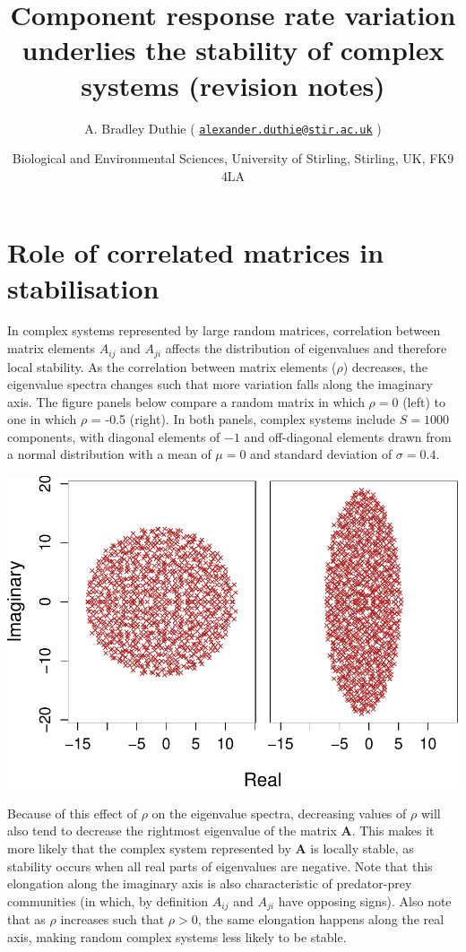 \documentclass[]{article}
\title{Component response rate variation underlies the stability of complex
systems (revision notes)}
\author{A. Bradley Duthie (
\href{mailto:alexander.duthie@stir.ac.uk}{\nolinkurl{alexander.duthie@stir.ac.uk}}
)}
\date{Biological and Environmental Sciences, University of Stirling, Stirling,
UK, FK9 4LA}
\begin{document}
\maketitle

\hypertarget{role-of-correlated-matrices-in-stabilisation}{%
\section{Role of correlated matrices in
stabilisation}\label{role-of-correlated-matrices-in-stabilisation}}

In complex systems represented by large random matrices, correlation
between matrix elements \(A_{ij}\) and \(A_{ji}\) affects the
distribution of eigenvalues and therefore local stability. As the
correlation between matrix elements (\(\rho\)) decreases, the eigenvalue
spectra changes such that more variation falls along the imaginary axis.
The figure panels below compare a random matrix in which \(\rho = 0\)
(left) to one in which \(\rho\) = -0.5 (right). In both panels, complex
systems include \(S = 1000\) components, with diagonal elements of
\(-1\) and off-diagonal elements drawn from a normal distribution with a
mean of \(\mu = 0\) and standard deviation of \(\sigma = 0.4\).

\includegraphics{revision_notes_files/figure-latex/unnamed-chunk-2-1.pdf}

Because of this effect of \(\rho\) on the eigenvalue spectra, decreasing
values of \(\rho\) will also tend to decrease the rightmost eigenvalue
of the matrix \(\textbf{A}\). This makes it more likely that the complex
system represented by \(\textbf{A}\) is locally stable, as stability
occurs when all real parts of eigenvalues are negative. Note that this
elongation along the imaginary axis is also characteristic of
predator-prey communities (in which, by definition \(A_{ij}\) and
\(A_{ji}\) have opposing signs). Also note that as \(\rho\) increases
such that \(\rho > 0\), the same elongation happens along the real axis,
making random complex systems less likely to be stable.
\end{document}
